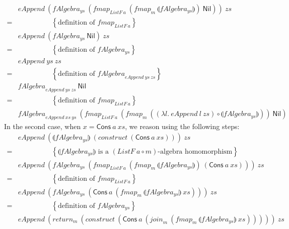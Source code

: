 \documentclass{jfp1}
\newcommand{\fold}[1]{\llparenthesis #1 \rrparenthesis}
\newcommand{\eqAnnotation}[1]{\hspace{2cm}\left\{\textrm{#1}\right\}}
\begin{document}
\begin{proof*}
\begin{displaymath}
\begin{array}{cl}
      &\mathit{eAppend}~(\mathit{fAlgebra_{ys}}~(\mathit{fmap}_{\mathit{ListF}~a}~(\mathit{fmap}_m~\fold{\mathit{fAlgebra_{ys}}})~\mathsf{Nil}))~\mathit{zs} \\
      =&\eqAnnotation{definition of $\mathit{fmap_{\mathit{ListF}~a}}$} \\
      &\mathit{eAppend}~(\mathit{fAlgebra_{ys}}~\mathsf{Nil})~\mathit{zs} \\
      =&\eqAnnotation{definition of $\mathit{fAlgebra_{ys}}$} \\
      &\mathit{eAppend}~\mathit{ys}~\mathit{zs} \\
      =&\eqAnnotation{definition of $\mathit{fAlgebra}_{\mathit{eAppend}~\mathit{ys}~\mathit{zs}}$} \\
      &\mathit{fAlgebra}_{\mathit{eAppend}~\mathit{ys}~\mathit{zs}}~\mathsf{Nil} \\
      =&\eqAnnotation{definition of $\mathit{fmap}_{\mathit{ListF}~a}$} \\
      &\mathit{fAlgebra}_{\mathit{eAppend}~\mathit{xs}~\mathit{ys}}~(\mathit{fmap}_{\mathit{ListF}~a}~(\mathit{fmap}_m~((\lambda l.~\mathit{eAppend}~l~\mathit{zs}) \circ \fold{\mathit{fAlgebra_{ys}}}))~\mathsf{Nil})
    \end{array}
  \end{displaymath}
  In the second case, when $x = \mathsf{Cons}~a~\mathit{xs}$, we
  reason using the following steps:
  \begin{displaymath}
    \begin{array}{cl}
      &\mathit{eAppend}~(\fold{\mathit{fAlgebra_{ys}}}~(\mathit{construct}~(\mathsf{Cons}~a~\mathit{xs})))~\mathit{zs} \\
      =&\eqAnnotation{$\fold{\mathit{fAlgebra_{ys}}}$ is a $(\mathit{ListF}~a \circ m)$-algebra homomorphism} \\
      &\mathit{eAppend}~(\mathit{fAlgebra_{ys}}~(\mathit{fmap}_{\mathit{ListF}~a}~(\mathit{fmap}_m~\fold{\mathit{fAlgebra_{ys}}})~(\mathsf{Cons}~a~\mathit{xs})))~\mathit{zs} \\
      =&\eqAnnotation{definition of $\mathit{fmap_{\mathit{ListF}~a}}$} \\
      &\mathit{eAppend}~(\mathit{fAlgebra_{ys}}~(\mathsf{Cons}~a~(\mathit{fmap}_m~\fold{\mathit{fAlgebra_{ys}}}~\mathit{xs})))~\mathit{zs} \\
      =&\eqAnnotation{definition of $\mathit{fAlgebra_{ys}}$} \\
      & \mathit{eAppend}~(\mathit{return}_m~(\mathit{construct}~(\mathsf{Cons}~a~(\mathit{join}_m~(\mathit{fmap_m}~\fold{\mathit{fAlgebra_{ys}}}~\mathit{xs})))))~\mathit{zs} \\

\end{array}
\end{displaymath}
\end{proof*}
\end{document}
